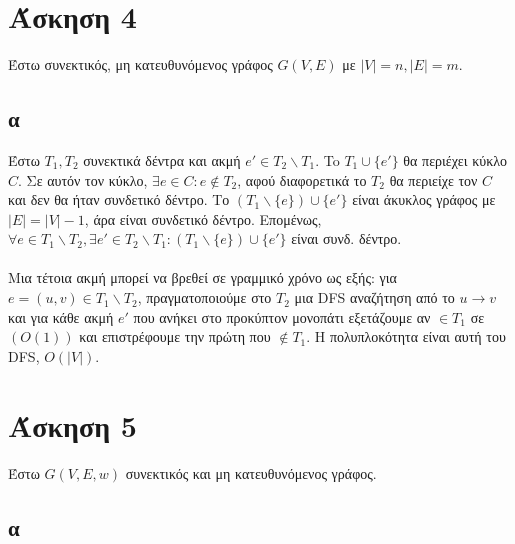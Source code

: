 \documentclass[12pt,a4paper]{article}
\begin{document}
  \section{Άσκηση 4}

  Έστω συνεκτικός, μη κατευθυνόμενος γράφος \( G(V, E) \) με \( |V| = n,
  |E| = m \).

  \subsection{α}

  Έστω \(T_1, T_2\) συνεκτικά δέντρα και ακμή \(e' \in T_2 \backslash T_1\).
  To \(T_1 \cup \{e'\}\) θα περιέχει κύκλο \(C\). Σε αυτόν τον κύκλο, \(\exists
  e \in C: e \notin T_2\), αφού διαφορετικά το \(Τ_2\) θα περιείχε τον \(C\)
  και δεν θα ήταν συνδετικό δέντρο. Το \((T_1 \backslash \{e\}) \cup \{e'\} \)
  είναι άκυκλος γράφος με \(|E| = |V| - 1\), άρα είναι συνδετικό δέντρο.
  Επομένως, \(\forall e \in T_1 \backslash T_2, \exists e' \in T_2 \backslash
  T_1: (T_1 \backslash \{e\}) \cup \{e'\}\) είναι συνδ. δέντρο.
  \\
  \\
  Μια τέτοια ακμή μπορεί να βρεθεί σε γραμμικό χρόνο ως εξής: για \(e = (u, v)
  \in T_1 \backslash T_2 \), πραγματοποιούμε στο \(T_2 \) μια {\latintext DFS}
  αναζήτηση από το \(u \rightarrow v\) και για κάθε ακμή \(e'\) που ανήκει στο
  προκύπτον μονοπάτι εξετάζουμε αν \(\in Τ_1\) σε \((O(1))\) και επιστρέφουμε 
  την πρώτη που \(\notin T_1\). Η πολυπλοκότητα είναι αυτή του {\latintext DFS},
  \(O(|V|)\).
  
  \section{Άσκηση 5}

  Έστω \(G(V, E, w)\) συνεκτικός και μη κατευθυνόμενος γράφος.

  \subsection{α}
\end{document}
